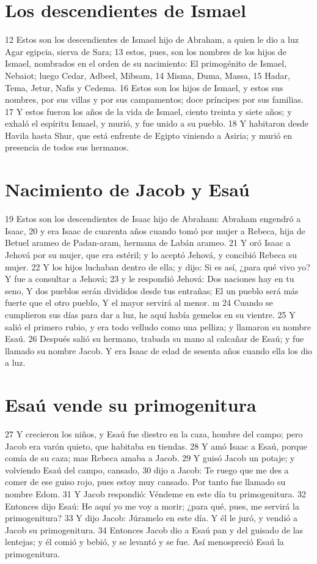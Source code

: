 \section{Los descendientes de Ismael}

12 Estos son los descendientes de Ismael hijo de Abraham, a quien le dio a luz Agar egipcia, sierva de Sara;
13 estos, pues, son los nombres de los hijos de Ismael, nombrados en el orden de su nacimiento: El primogénito de Ismael, Nebaiot; luego Cedar, Adbeel, Mibsam,
14 Misma, Duma, Massa,
15 Hadar, Tema, Jetur, Nafis y Cedema.
16 Estos son los hijos de Ismael, y estos sus nombres, por sus villas y por sus campamentos; doce príncipes por sus familias.
17 Y estos fueron los años de la vida de Ismael, ciento treinta y siete años; y exhaló el espíritu Ismael, y murió, y fue unido a su pueblo.
18 Y habitaron desde Havila hasta Shur, que está enfrente de Egipto viniendo a Asiria; y murió en presencia de todos sus hermanos.

\section{Nacimiento de Jacob y Esaú}

19 Estos son los descendientes de Isaac hijo de Abraham: Abraham engendró a Isaac,
20 y era Isaac de cuarenta años cuando tomó por mujer a Rebeca, hija de Betuel arameo de Padan-aram, hermana de Labán arameo.
21 Y oró Isaac a Jehová por su mujer, que era estéril; y lo aceptó Jehová, y concibió Rebeca su mujer.
22 Y los hijos luchaban dentro de ella; y dijo: Si es así, ¿para qué vivo yo? Y fue a consultar a Jehová;
23 y le respondió Jehová:
    Dos naciones hay en tu seno,
    Y dos pueblos serán divididos desde tus entrañas;
    El un pueblo será más fuerte que el otro pueblo,
    Y el mayor servirá al menor. m
24 Cuando se cumplieron sus días para dar a luz, he aquí había gemelos en su vientre.
25 Y salió el primero rubio, y era todo velludo como una pelliza; y llamaron su nombre Esaú.
26 Después salió su hermano, trabada su mano al calcañar de Esaú; y fue llamado su nombre Jacob. Y era Isaac de edad de sesenta años cuando ella los dio a luz.

\section{Esaú vende su primogenitura}

27 Y crecieron los niños, y Esaú fue diestro en la caza, hombre del campo; pero Jacob era varón quieto, que habitaba en tiendas.
28 Y amó Isaac a Esaú, porque comía de su caza; mas Rebeca amaba a Jacob.
29 Y guisó Jacob un potaje; y volviendo Esaú del campo, cansado,
30 dijo a Jacob: Te ruego que me des a comer de ese guiso rojo, pues estoy muy cansado. Por tanto fue llamado su nombre Edom.
31 Y Jacob respondió: Véndeme en este día tu primogenitura.
32 Entonces dijo Esaú: He aquí yo me voy a morir; ¿para qué, pues, me servirá la primogenitura?
33 Y dijo Jacob: Júramelo en este día. Y él le juró, y vendió a Jacob su primogenitura.
34 Entonces Jacob dio a Esaú pan y del guisado de las lentejas; y él comió y bebió, y se levantó y se fue. Así menospreció Esaú la primogenitura.

